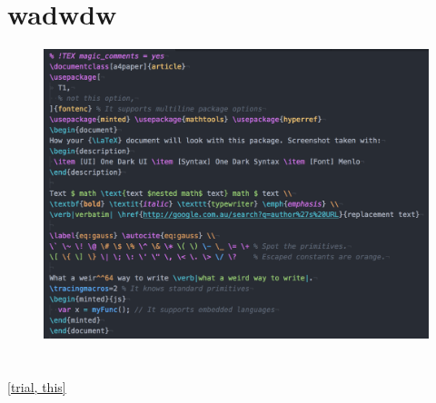 \documentclass{article}
\begin{document}

\section{wadwdw}







\begin{figure}[h t p b] %
  \centering
  \includegraphics[width=\textwidth]{./fig1}
\caption{}
  \label{}
\end{figure}
\section{}

\ref{trial, this}

\cite{world}
\end{document}
